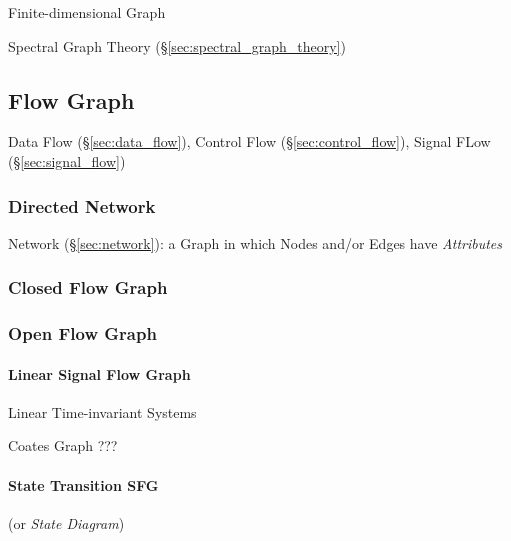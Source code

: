 Finite-dimensional Graph

\fist Spectral Graph Theory (\S\ref{sec:spectral_graph_theory})



\subsection{Flow Graph}\label{sec:flow_graph}

\fist Data Flow (\S\ref{sec:data_flow}), Control Flow
(\S\ref{sec:control_flow}), Signal FLow (\S\ref{sec:signal_flow})



\subsubsection{Directed Network}\label{sec:directed_network}

\fist Network (\S\ref{sec:network}): a Graph in which Nodes and/or Edges have
\emph{Attributes}



\subsubsection{Closed Flow Graph}\label{sec:closed_flowgraph}

\subsubsection{Open Flow Graph}\label{sec:open_flowgraph}

\paragraph{Linear Signal Flow Graph}\label{sec:linear_signal_flow}\hfill

Linear Time-invariant Systems

Coates Graph ??? %



\paragraph{State Transition SFG}\label{sec:state_transition_sfg}\hfill

(or \emph{State Diagram})




